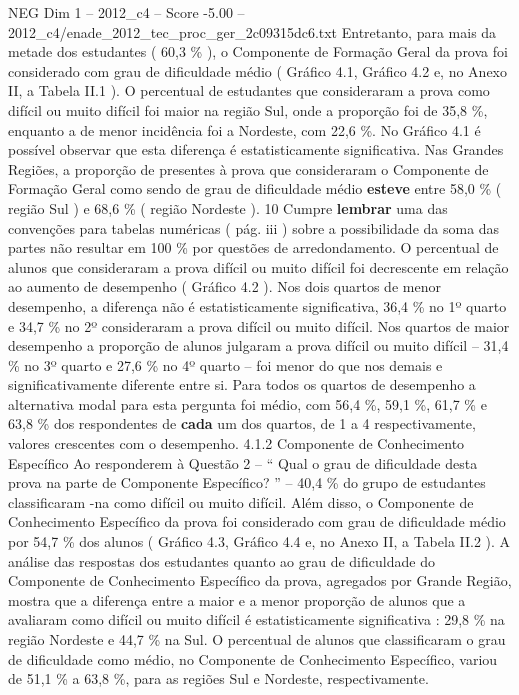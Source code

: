 \begin{textsample}{NEG Dim 1 – 2012\_c4 – Score -5.00 – 2012\_c4/enade\_2012\_tec\_proc\_ger\_2c09315dc6.txt}
Entretanto, para mais da metade dos estudantes ( 60,3 \% ), o Componente de Formação Geral da prova foi considerado com grau de dificuldade médio ( Gráfico 4.1, Gráfico 4.2 e, no Anexo II, a Tabela II.1 ).
O percentual de estudantes que consideraram a prova como difícil ou muito difícil foi maior na região Sul, onde a proporção foi de 35,8 \%, enquanto a de menor incidência foi a Nordeste, com 22,6 \%.
No Gráfico 4.1 é possível observar que esta diferença é estatisticamente significativa.
Nas Grandes Regiões, a proporção de presentes à prova que consideraram o Componente de Formação Geral como sendo de grau de dificuldade médio \textbf{esteve} entre 58,0 \% ( região Sul ) e 68,6 \% ( região Nordeste ). 10 Cumpre \textbf{lembrar} uma das convenções para tabelas numéricas ( pág. iii ) sobre a possibilidade da soma das partes não resultar em 100 \% por questões de arredondamento.
O percentual de alunos que consideraram a prova difícil ou muito difícil foi decrescente em relação ao aumento de desempenho ( Gráfico 4.2 ).
Nos dois quartos de menor desempenho, a diferença não é estatisticamente significativa, 36,4 \% no 1º quarto e 34,7 \% no 2º consideraram a prova difícil ou muito difícil.
Nos quartos de maior desempenho a proporção de alunos julgaram a prova difícil ou muito difícil – 31,4 \% no 3º quarto e 27,6 \% no 4º quarto – foi menor do que nos demais e significativamente diferente entre si.
Para todos os quartos de desempenho a alternativa modal para esta pergunta foi médio, com 56,4 \%, 59,1 \%, 61,7 \% e 63,8 \% dos respondentes de \textbf{cada} um dos quartos, de 1 a 4 respectivamente, valores crescentes com o desempenho. 4.1.2 Componente de Conhecimento Específico Ao responderem à Questão 2 – “ Qual o grau de dificuldade desta prova na parte de Componente Específico? ” – 40,4 \% do grupo de estudantes classificaram -na como difícil ou muito difícil.
Além disso, o Componente de Conhecimento Específico da prova foi considerado com grau de dificuldade médio por 54,7 \% dos alunos ( Gráfico 4.3, Gráfico 4.4 e, no Anexo II, a Tabela II.2 ).
A análise das respostas dos estudantes quanto ao grau de dificuldade do Componente de Conhecimento Específico da prova, agregados por Grande Região, mostra que a diferença entre a maior e a menor proporção de alunos que a avaliaram como difícil ou muito difícil é estatisticamente significativa : 29,8 \% na região Nordeste e 44,7 \% na Sul.
O percentual de alunos que classificaram o grau de dificuldade como médio, no Componente de Conhecimento Específico, variou de 51,1 \% a 63,8 \%, para as regiões Sul e Nordeste, respectivamente.

\end{textsample}
